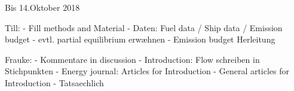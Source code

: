 Bis 14.Oktober 2018

Till:
- Fill methods and Material
- Daten: Fuel data / Ship data / Emission budget
- evtl. partial equilibrium erwæhnen
- Emission budget Herleitung

Frauke:
- Kommentare in discussion
- Introduction: Flow schreiben in Stichpunkten
- Energy journal: Articles for Introduction
- General articles for Introduction
- Tatsaechlich


